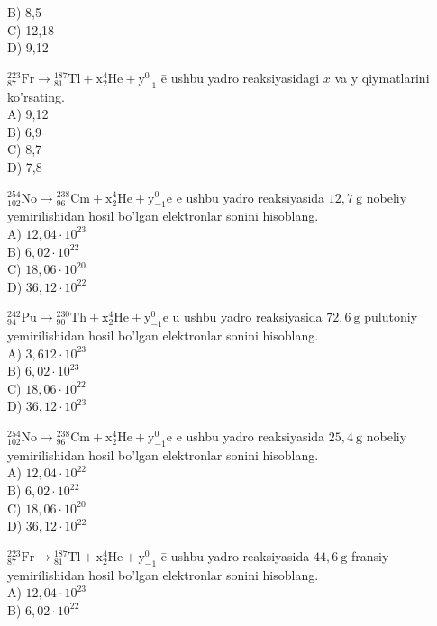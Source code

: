 B) 8,5\\
C) 12,18\\
D) 9,12
  \item ${ }_{87}^{223} \mathrm{Fr} \rightarrow{ }_{81}^{187} \mathrm{Tl}+\mathrm{x}_{2}^{4} \mathrm{He}+\mathrm{y}_{-1}^{0}$ ē ushbu yadro reaksiyasidagi $x$ va y qiymatlarini ko'rsating.\\
A) 9,12\\
B) 6,9\\
C) 8,7\\
D) 7,8
  \item ${ }_{102}^{254} \mathrm{No} \rightarrow{ }_{96}^{238} \mathrm{Cm}+\mathrm{x}_{2}^{4} \mathrm{He}+\mathrm{y}_{-1}^{0} \mathrm{e}$ e ushbu yadro reaksiyasida $12,7 \mathrm{~g}$ nobeliy yemirilishidan hosil bo'lgan elektronlar sonini hisoblang.\\
A) $12,04 \cdot 10^{23}$\\
B) $6,02 \cdot 10^{22}$\\
C) $18,06 \cdot 10^{20}$\\
D) $36,12 \cdot 10^{22}$
  \item ${ }_{94}^{242} \mathrm{Pu} \rightarrow{ }_{90}^{230} \mathrm{Th}+\mathrm{x}_{2}^{4} \mathrm{He}+\mathrm{y}_{-1}^{0} \mathrm{e}$ u ushbu yadro reaksiyasida $72,6 \mathrm{~g}$ pulutoniy yemirilishidan hosil bo'lgan elektronlar sonini hisoblang.\\
A) $3,612 \cdot 10^{23}$\\
B) $6,02 \cdot 10^{23}$\\
C) $18,06 \cdot 10^{22}$\\
D) $36,12 \cdot 10^{23}$
  \item ${ }_{102}^{254} \mathrm{No} \rightarrow{ }_{96}^{238} \mathrm{Cm}+\mathrm{x}_{2}^{4} \mathrm{He}+\mathrm{y}_{-1}^{0} \mathrm{e}$ e ushbu yadro reaksiyasida $25,4 \mathrm{~g}$ nobeliy yemirilishidan hosil bo'lgan elektronlar sonini hisoblang.\\
A) $12,04 \cdot 10^{22}$\\
B) $6,02 \cdot 10^{22}$\\
C) $18,06 \cdot 10^{20}$\\
D) $36,12 \cdot 10^{22}$
  \item ${ }_{87}^{223} \mathrm{Fr} \rightarrow{ }_{81}^{187} \mathrm{Tl}+\mathrm{x}_{2}^{4} \mathrm{He}+\mathrm{y}_{-1}^{0}$ ē ushbu yadro reaksiyasida $44,6 \mathrm{~g}$ fransiy yemirílishidan hosil bo'lgan elektronlar sonini hisoblang.\\
A) $12,04 \cdot 10^{23}$\\
B) $6,02 \cdot 10^{22}$\\

